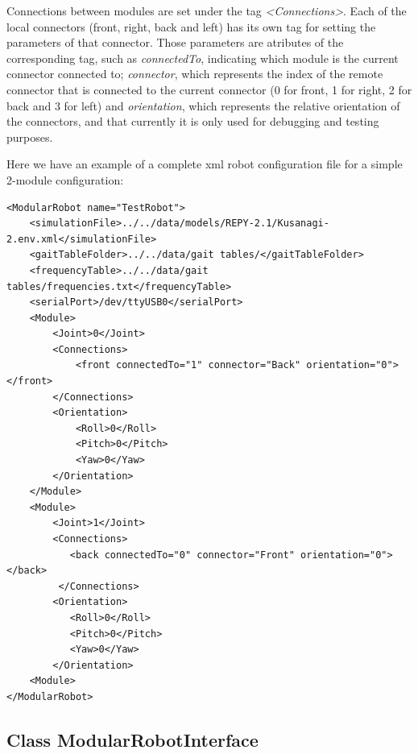 \begin{itemize}
	Connections between modules are set under the tag \emph{<Connections>}. Each of the local connectors (front, right, back and left) has its own tag for setting the parameters of that connector. Those parameters are atributes of the corresponding tag, such as \emph{connectedTo}, indicating which module is the current connector connected to; \emph{connector}, which represents the index of the remote connector that is connected to the current connector (0 for front, 1 for right, 2 for back and 3 for left) and  \emph{orientation}, which represents the relative orientation of the connectors, and that currently it is only used for debugging and testing purposes.

	Here we have an example of a complete xml robot configuration file for a simple 2-module configuration:
	\XML
\begin{lstlisting}
<ModularRobot name="TestRobot">
    <simulationFile>../../data/models/REPY-2.1/Kusanagi-2.env.xml</simulationFile>
    <gaitTableFolder>../../data/gait tables/</gaitTableFolder>
    <frequencyTable>../../data/gait tables/frequencies.txt</frequencyTable>
    <serialPort>/dev/ttyUSB0</serialPort>  	
    <Module>
        <Joint>0</Joint>		
        <Connections>
            <front connectedTo="1" connector="Back" orientation="0"></front>
        </Connections>
        <Orientation>
            <Roll>0</Roll>
            <Pitch>0</Pitch>
            <Yaw>0</Yaw>
        </Orientation>
    </Module>
    <Module>
        <Joint>1</Joint>
        <Connections>
           <back connectedTo="0" connector="Front" orientation="0"></back>
         </Connections>
        <Orientation>
           <Roll>0</Roll>
           <Pitch>0</Pitch>
           <Yaw>0</Yaw>
        </Orientation>
    <Module>
</ModularRobot>
\end{lstlisting}
	
\end{itemize}

\newpage

\subsection{Class ModularRobotInterface}
\label{software_class_modularrobotinterface}

